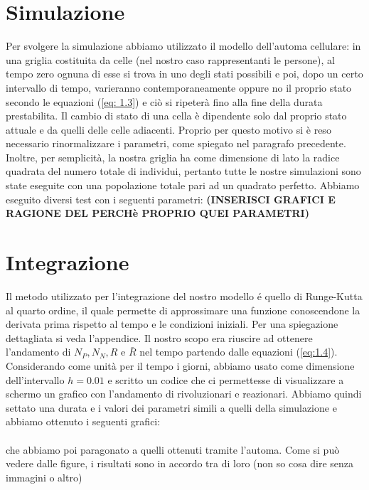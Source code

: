 \section{Simulazione}
Per svolgere la simulazione abbiamo utilizzato il modello dell'automa cellulare: in una griglia costituita da celle (nel nostro caso rappresentanti le persone), al tempo zero ognuna di esse si trova in uno degli stati possibili e poi, dopo un certo intervallo di tempo, varieranno contemporaneamente oppure no il proprio stato secondo le equazioni (\ref{eq: 1.3}) e ciò si ripeterà fino alla fine della durata prestabilita. Il cambio di stato di una cella è dipendente solo dal proprio stato attuale e da quelli delle celle adiacenti. Proprio per questo motivo si è reso necessario rinormalizzare i parametri, come spiegato nel paragrafo precedente. Inoltre, per semplicità, la nostra griglia ha come dimensione di lato la radice quadrata del numero totale di individui, pertanto tutte le nostre simulazioni sono state eseguite con una popolazione totale pari ad un quadrato perfetto. 
Abbiamo eseguito diversi test con i seguenti parametri:
\textbf{(INSERISCI GRAFICI E RAGIONE DEL PERCHè PROPRIO QUEI PARAMETRI)}
\section{Integrazione}
Il metodo utilizzato per l'integrazione del nostro modello é quello di Runge-Kutta al quarto ordine, il quale permette di approssimare una funzione conoscendone la derivata prima rispetto al tempo e le condizioni iniziali. Per una spiegazione dettagliata si veda l'appendice.
Il nostro scopo era riuscire ad ottenere l'andamento di $ N_{P}, N_{N}, R$ e $\bar{R} $ nel tempo partendo dalle equazioni (\ref{eq:1.4}).\\
Considerando come unità per il tempo i giorni, abbiamo usato come dimensione dell'intervallo $ h=0.01 $ e scritto un codice che ci permettesse di visualizzare a schermo un grafico con l'andamento di rivoluzionari e reazionari. 
Abbiamo quindi settato una durata e i valori dei parametri simili a quelli della simulazione e abbiamo ottenuto i seguenti grafici:
\\\\
che abbiamo poi paragonato a quelli ottenuti tramite l'automa. 
Come si può vedere dalle figure, i risultati sono in accordo tra di loro (non so cosa dire senza immagini o altro)
